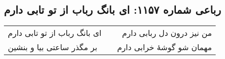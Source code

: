 \begin{center}
\section*{رباعی شماره ۱۱۵۷: ای بانگ رباب از تو تابی دارم}
\label{sec:1157}
\begin{longtable}{l p{0.5cm} r}
ای بانگ رباب از تو تابی دارم
&&
من نیز درون دل ربابی دارم
\\
بر مگذر ساعتی بیا و بنشین
&&
مهمان شو گوشهٔ خرابی دارم
\\
\end{longtable}
\end{center}
